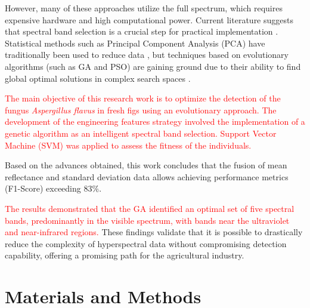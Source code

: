 \documentclass[aipa,article,submit,pdftex,moreauthors]{Definitions/mdpi}
\begin{document}

However, many of these approaches utilize the full spectrum, which requires expensive hardware and high computational power. 
Current literature suggests that spectral band selection is a crucial step for practical implementation \cite{sawant_survey_2020}. 
Statistical methods such as Principal Component Analysis (PCA) have traditionally been used to reduce data \cite{chu_classifying_2020}, but techniques based on evolutionary algorithms (such as GA and PSO) are gaining ground due to their ability to find global optimal solutions in complex search spaces \cite{sawant_survey_2020}.



\textcolor{red}{The main objective of this research work is to optimize the detection of the fungus \textit{Aspergillus flavus} in fresh figs using an evolutionary approach. The development of the engineering features strategy involved the implementation of a genetic algorithm as an intelligent spectral band selection. Support Vector Machine (SVM) was applied to assess the fitness of the individuals.}

Based on the advances obtained, this work concludes that the fusion of mean reflectance and standard deviation data allows achieving performance metrics (F1-Score) exceeding $83\%$. %

\textcolor{red}{The results demonstrated that the GA identified an optimal set of five spectral bands, predominantly in the visible spectrum, with bands near the ultraviolet and near-infrared regions.}
These findings validate that it is possible to drastically reduce the complexity of hyperspectral data without compromising detection capability, offering a promising path for the agricultural industry.

\section{Materials and Methods}
\end{document}
